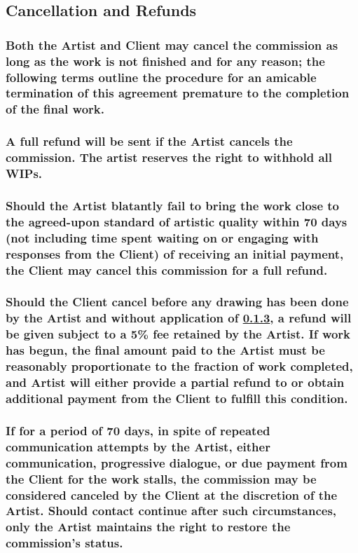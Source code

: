 \documentclass{article}
\begin{document}
\begin{flushleft}
	\leftskip=1cm
	\subsection{Cancellation and Refunds}
	\leftskip=2cm

		\subsubsection[At-will Termination]{\normalfont Both the Artist and Client may cancel the commission as long as the work is not finished and for any reason; the following terms outline the procedure for an amicable termination of this agreement premature to the completion of the final work.}
		
		\subsubsection[Cancellation by the Artist]{\normalfont A full refund will be sent if the Artist cancels the commission. The artist reserves the right to withhold all WIPs.}
		
		\subsubsection[Failure to Complete by Deadline]{\normalfont Should the Artist blatantly fail to bring the work close to the agreed-upon standard of artistic quality within 70 days (not including time spent waiting on or engaging with responses from the Client) of receiving an initial payment, the Client may cancel this commission for a full refund.}\label{failuretocomplete}
		
		\subsubsection[Cancellation by the Client]{\normalfont Should the Client cancel before any drawing has been done by the Artist and without application of \ref{failuretocomplete}, a refund will be given subject to a 5\% fee retained by the Artist. If work has begun, the final amount paid to the Artist must be reasonably proportionate to the fraction of work completed, and Artist will either provide a partial refund to or obtain additional payment from the Client to fulfill this condition.}

		\subsubsection[Unreachable Client]{\normalfont If for a period of 70 days, in spite of repeated communication attempts by the Artist, either communication, progressive dialogue, or due payment from the Client for the work stalls, the commission may be considered canceled by the Client at the discretion of the Artist. Should contact continue after such circumstances, only the Artist maintains the right to restore the commission's status.}


\end{flushleft}
\end{document}
